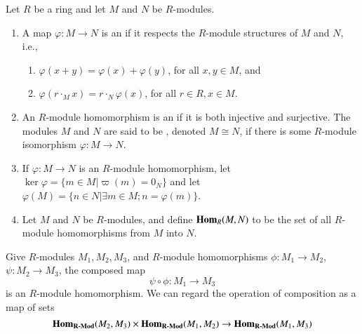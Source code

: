 \begin{defn}[D\&F]
    Let $R$ be a ring and let $M$ and $N$ be $R$-modules.
    \begin{enumerate}
        \item A map $\varphi:M\rightarrow N$ is an  if it respects the $R$-module structures of $M$ and $N$, i.e., \begin{enumerate}
                \item $\varphi(x+y) = \varphi(x)+\varphi(y)$, for all $x,y  \in M$, and 
                \item $\varphi(r\cdot_Mx) = r\cdot_N\varphi(x)$, for all $r \in R, x \in M$.
        \end{enumerate}
        \item An $R$-module homomorphism is an  if it is both injective and surjective. The modules $M$ and $N$ are said to be , denoted $M\cong N$, if there is some $R$-module isomorphism $\varphi:M\rightarrow N$.
        \item If $\varphi:M\rightarrow N$ is an $R$-module homomorphism, let $\ker\varphi = \{m \in M\vert \varpi(m) = 0_N\}$ and let $\varphi(M) = \{n \in N\vert \exists m \in M; n = \varphi(m)\}$.
        \item Let $M$ and $N$ be $R$-modules, and define $\mathbf{Hom}_R(M,N)$ to be the set of all $R$-module homomorphisms from $M$ into $N$.
    \end{enumerate}
\end{defn}


\begin{rmk}
    Give $R$-modules $M_1,M_2,M_3$, and $R$-module homomorphisms $\phi:M_1\rightarrow M_2$, $\psi:M_2\rightarrow M_3$, the composed map \begin{equation}
        \psi \circ \phi:M_1\rightarrow M_3
    \end{equation}
    is an $R$-module homomorphism. We can regard the operation of composition as a map of sets \begin{equation}
        \mathbf{Hom}_{\normalfont\textbf{R-Mod}}(M_2,M_3)\times\mathbf{Hom}_{\normalfont\textbf{R-Mod}}(M_1,M_2) \rightarrow \mathbf{Hom}_{\normalfont\textbf{R-Mod}}(M_1,M_3)
    \end{equation}
\end{rmk}

